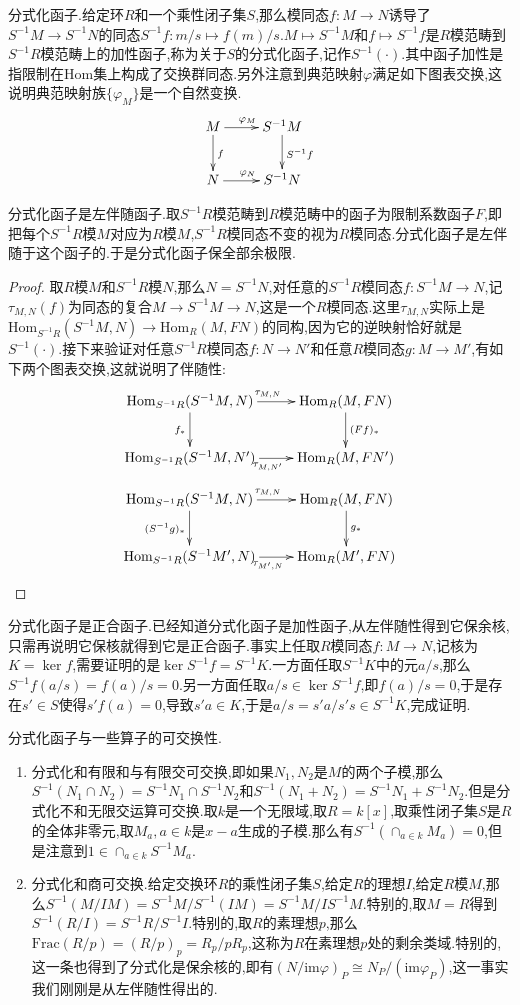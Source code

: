 分式化函子.给定环$R$和一个乘性闭子集$S$,那么模同态$f:M\to N$诱导了$S^{-1}M\to S^{-1}N$的同态$S^{-1}f:m/s\mapsto f(m)/s$.$M\mapsto S^{-1}M$和$f\mapsto S^{-1}f$是$R$模范畴到$S^{-1}R$模范畴上的加性函子,称为关于$S$的分式化函子,记作$S^{-1}(\cdot)$.其中函子加性是指限制在Hom集上构成了交换群同态.另外注意到典范映射$\varphi$满足如下图表交换,这说明典范映射族$\{\varphi_M\}$是一个自然变换.
$$\xymatrix{M\ar[r]^{\varphi_M}\ar[d]^{f}&S^{-1}M\ar[d]^{S^{-1}f}\\ N\ar[r]^{\varphi_N}&S^{-1}N}$$

分式化函子是左伴随函子.取$S^{-1}R$模范畴到$R$模范畴中的函子为限制系数函子$F$,即把每个$S^{-1}R$模$M$对应为$R$模$M$,$S^{-1}R$模同态不变的视为$R$模同态.分式化函子是左伴随于这个函子的.于是分式化函子保全部余极限.
\begin{proof}

取$R$模$M$和$S^{-1}R$模$N$,那么$N=S^{-1}N$,对任意的$S^{-1}R$模同态$f:S^{-1}M\to N$,记$\tau_{M,N}(f)$为同态的复合$M\to S^{-1}M\to N$,这是一个$R$模同态.这里$\tau_{M,N}$实际上是$\mathrm{Hom}_{S^{-1}R}(S^{-1}M,N)\to\mathrm{Hom}_R(M,FN)$的同构,因为它的逆映射恰好就是$S^{-1}(\cdot)$.接下来验证对任意$S^{-1}R$模同态$f:N\to N'$和任意$R$模同态$g:M\to M'$,有如下两个图表交换,这就说明了伴随性:
$$\xymatrix{\mathrm{Hom}_{S^{-1}R}(S^{-1}M,N)\ar[d]_{f_*}\ar[r]^{\tau_{M,N}}&\mathrm{Hom}_R(M,FN)\ar[d]^{(Ff)_*}\\ \mathrm{Hom}_{S^{-1}R}(S^{-1}M,N')\ar[r]_{\tau_{M,N'}}&\mathrm{Hom}_R(M,FN')
}$$
$$\xymatrix{\mathrm{Hom}_{S^{-1}R}(S^{-1}M,N)\ar[d]_{(S^{-1}g)_*}\ar[r]^{\tau_{M,N}}&\mathrm{Hom}_R(M,FN)\ar[d]^{g_*}\\ \mathrm{Hom}_{S^{-1}R}(S^{-1}M',N)\ar[r]_{\tau_{M',N}}&\mathrm{Hom}_R(M',FN)
}$$
\end{proof}

分式化函子是正合函子.已经知道分式化函子是加性函子,从左伴随性得到它保余核,只需再说明它保核就得到它是正合函子.事实上任取$R$模同态$f:M\to N$,记核为$K=\ker f$,需要证明的是$\ker S^{-1}f=S^{-1}K$.一方面任取$S^{-1}K$中的元$a/s$,那么$S^{-1}f(a/s)=f(a)/s=0$.另一方面任取$a/s\in\ker S^{-1}f$,即$f(a)/s=0$,于是存在$s'\in S$使得$s'f(a)=0$,导致$s'a\in K$,于是$a/s=s'a/s's\in S^{-1}K$,完成证明.

分式化函子与一些算子的可交换性.
\begin{enumerate}
	\item 分式化和有限和与有限交可交换,即如果$N_1,N_2$是$M$的两个子模,那么$S^{-1}(N_1\cap N_2)=S^{-1}N_1\cap S^{-1}N_2$和$S^{-1}(N_1+N_2)=S^{-1}N_1+S^{-1}N_2$.但是分式化不和无限交运算可交换.取$k$是一个无限域,取$R=k[x]$,取乘性闭子集$S$是$R$的全体非零元,取$M_a,a\in k$是$x-a$生成的子模.那么有$S^{-1}\left(\cap_{a\in k} M_a\right)=0$,但是注意到$1\in\cap_{a\in k}S^{-1}M_a$.
	\item 分式化和商可交换.给定交换环$R$的乘性闭子集$S$,给定$R$的理想$I$,给定$R$模$M$,那么$S^{-1}(M/IM)=S^{-1}M/S^{-1}(IM)=S^{-1}M/IS^{-1}M$.特别的,取$M=R$得到$S^{-1}(R/I)=S^{-1}R/S^{-1}I$.特别的,取$R$的素理想$p$,那么$\mathrm{Frac}(R/p)=(R/p)_p=R_p/pR_p$,这称为$R$在素理想$p$处的剩余类域.特别的,这一条也得到了分式化是保余核的,即有$(N/\mathrm{im}\varphi)_P\cong N_P/ (\mathrm{im}\varphi_P)$,这一事实我们刚刚是从左伴随性得出的.
\end{enumerate}

